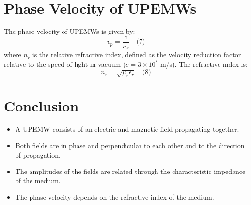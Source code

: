 \documentclass{article}
\begin{document}
\section{Phase Velocity of UPEMWs}
The phase velocity of UPEMWs is given by:
\begin{equation}
    v_p = \frac{c}{n_r} \quad \text{(7)}
\end{equation}
where $n_r$ is the relative refractive index, defined as the velocity reduction factor relative to the speed of light in vacuum ($c = 3 \times 10^8$ m/s). The refractive index is:
\begin{equation}
    n_r = \sqrt{\mu_r \epsilon_r} \quad \text{(8)}
\end{equation}

\section{Conclusion}
\begin{itemize}
    \item A UPEMW consists of an electric and magnetic field propagating together.
    \item Both fields are in phase and perpendicular to each other and to the direction of propagation.
    \item The amplitudes of the fields are related through the characteristic impedance of the medium.
    \item The phase velocity depends on the refractive index of the medium.
\end{itemize}
\end{document}

